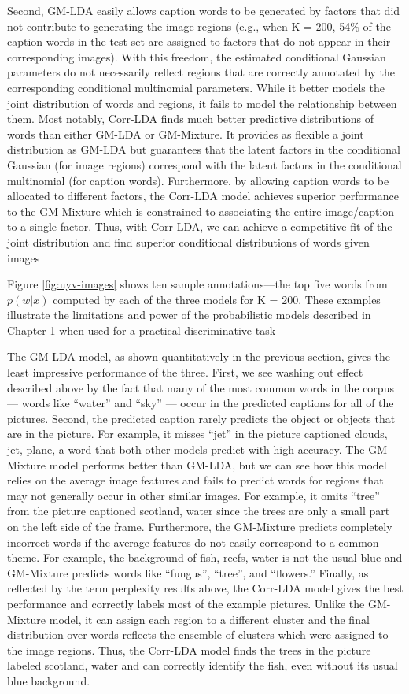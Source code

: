 Second, GM-LDA easily allows caption words to be generated by factors that did not contribute to generating the image regions (e.g., when K = 200, 54\% of the caption words in the test set are assigned to factors that do not appear in their corresponding images). With this freedom, the estimated conditional Gaussian parameters do not necessarily reflect regions that are correctly annotated by the corresponding conditional multinomial parameters. While it better models the joint distribution of words and regions, it fails to model the relationship between them. Most notably, Corr-LDA finds much better predictive
distributions of words than either GM-LDA or GM-Mixture. It provides as flexible a joint distribution as GM-LDA but guarantees that the latent factors in the conditional Gaussian (for image regions) correspond with the latent factors in the conditional multinomial (for caption words). Furthermore, by allowing caption words to be allocated to different factors, the Corr-LDA model achieves superior performance to the GM-Mixture which is constrained to associating the entire image/caption to a single factor. Thus, with Corr-LDA, we can achieve a competitive fit of the joint distribution and find superior conditional distributions of words given images

Figure \ref{fig:uyv-images} shows ten sample annotations—the top five words
from $p(w|x)$ computed by each of the three models for K = 200. These examples illustrate the limitations and
power of the probabilistic models described in Chapter 1 when used for a practical discriminative task

The GM-LDA model, as shown quantitatively in the previous section, gives the least impressive performance of the three. First, we see washing out effect described above by the fact that many of the most common words in the corpus — words like “water” and “sky” — occur in the predicted captions for all of the pictures. Second, the predicted caption rarely predicts the object or objects that are in the picture. For example, it misses “jet” in the picture captioned clouds, jet, plane, a word that both other models predict with high accuracy. The GM-Mixture model performs better than GM-LDA, but we can see how this model relies on the average image features and fails to predict words for regions that may not generally occur in other similar images. For example, it omits “tree” from the picture captioned scotland, water since the trees are only a small part on the left side of the frame. Furthermore, the GM-Mixture predicts completely incorrect words if the average features do not easily correspond to a common theme. For example, the background of fish, reefs, water is not the usual blue and GM-Mixture predicts words like “fungus”, “tree”, and “flowers.” Finally, as reflected by the term perplexity results above,
the Corr-LDA model gives the best performance and correctly labels most of the example pictures. Unlike the GM- Mixture model, it can assign each region to a different cluster and the final distribution over words reflects the ensemble of clusters which were assigned to the image regions. Thus, the Corr-LDA model finds the trees in the picture labeled scotland, water and can correctly identify the fish, even without its usual blue background.

